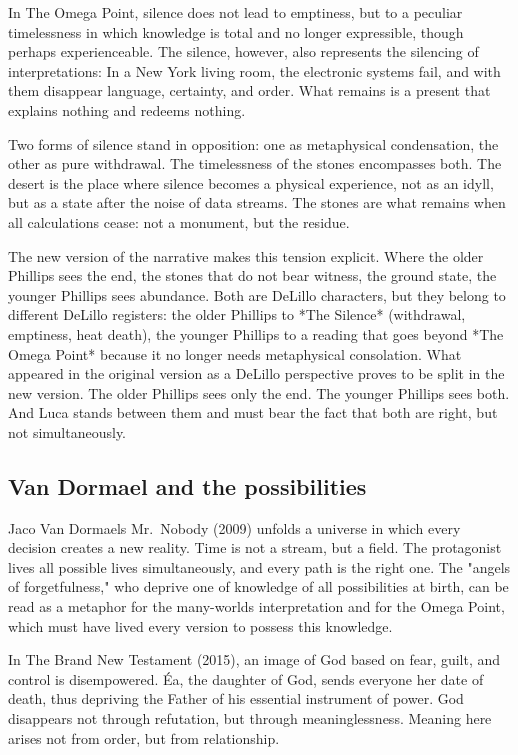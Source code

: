 \documentclass[
  ngerman,
]{article}
\begin{document}
In The Omega Point, silence does not lead to emptiness, but to a
peculiar timelessness in which knowledge is total and no longer
expressible, though perhaps experienceable. The silence, however, also
represents the silencing of interpretations: In a New York living room,
the electronic systems fail, and with them disappear language,
certainty, and order. What remains is a present that explains nothing
and redeems nothing.

Two forms of silence stand in opposition: one as metaphysical
condensation, the other as pure withdrawal. The timelessness of the
stones encompasses both. The desert is the place where silence becomes a
physical experience, not as an idyll, but as a state after the noise of
data streams. The stones are what remains when all calculations cease:
not a monument, but the residue.

The new version of the narrative makes this tension explicit. Where the
older Phillips sees the end, the stones that do not bear witness, the
ground state, the younger Phillips sees abundance. Both are DeLillo
characters, but they belong to different DeLillo registers: the older
Phillips to *The Silence* (withdrawal, emptiness, heat death), the
younger Phillips to a reading that goes beyond *The Omega Point* because
it no longer needs metaphysical consolation. What appeared in the
original version as a DeLillo perspective proves to be split in the new
version. The older Phillips sees only the end. The younger Phillips sees
both. And Luca stands between them and must bear the fact that both are
right, but not simultaneously.

\subsection{Van Dormael and the
possibilities}\label{van-dormael-and-the-possibilities}

Jaco Van Dormael\textquotesingle s Mr.~Nobody (2009) unfolds a universe
in which every decision creates a new reality. Time is not a stream, but
a field. The protagonist lives all possible lives simultaneously, and
every path is the right one. The "angels of forgetfulness," who deprive
one of knowledge of all possibilities at birth, can be read as a
metaphor for the many-worlds interpretation and for the Omega Point,
which must have lived every version to possess this knowledge.

In The Brand New Testament (2015), an image of God based on fear, guilt,
and control is disempowered. Éa, the daughter of God, sends everyone her
date of death, thus depriving the Father of his essential instrument of
power. God disappears not through refutation, but through
meaninglessness. Meaning here arises not from order, but from
relationship.
\end{document}
